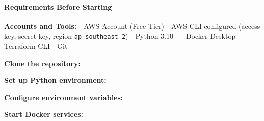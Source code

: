 \hypertarget{requirements-before-starting}{%
\paragraph{Requirements Before
Starting}}

\textbf{Accounts and Tools:} - AWS Account (Free Tier) - AWS CLI
configured (access key, secret key, region \texttt{ap-southeast-2}) -
Python 3.10+ - Docker Desktop - Terraform CLI - Git

\textbf{Clone the repository:}

\begin{Shaded}
\begin{Highlighting}[]
\OperatorTok{\textless{}}\OperatorTok{\textgreater{}}
\end{Highlighting}
\end{Shaded}

\textbf{Set up Python environment:}

\begin{Shaded}
\begin{Highlighting}[]
 
\end{Highlighting}
\end{Shaded}

\textbf{Configure environment variables:}

\begin{Shaded}
\begin{Highlighting}[]
\end{Highlighting}
\end{Shaded}

\textbf{Start Docker services:}

\begin{Shaded}
\begin{Highlighting}[]
\end{Highlighting}
\end{Shaded}

